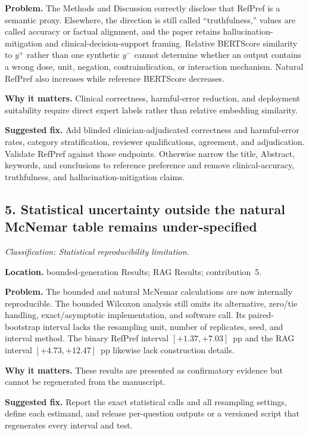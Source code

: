 \documentclass[11pt]{article}
\newcommand{\findinglabel}[1]{\textbf{#1}}
\newcommand{\classification}[1]{\textit{Classification: #1.}}
\begin{document}
\findinglabel{Problem.} The Methods and Discussion correctly disclose that RefPref is a semantic proxy.  Elsewhere, the direction is still called ``truthfulness,'' values are called accuracy or factual alignment, and the paper retains hallucination-mitigation and clinical-decision-support framing.  Relative BERTScore similarity to $y^+$ rather than one synthetic $y^-$ cannot determine whether an output contains a wrong dose, unit, negation, contraindication, or interaction mechanism.  Natural RefPref also increases while reference BERTScore decreases.

\findinglabel{Why it matters.} Clinical correctness, harmful-error reduction, and deployment suitability require direct expert labels rather than relative embedding similarity.

\findinglabel{Suggested fix.} Add blinded clinician-adjudicated correctness and harmful-error rates, category stratification, reviewer qualifications, agreement, and adjudication.  Validate RefPref against those endpoints.  Otherwise narrow the title, Abstract, keywords, and conclusions to reference preference and remove clinical-accuracy, truthfulness, and hallucination-mitigation claims.

\subsection*{5. Statistical uncertainty outside the natural McNemar table remains under-specified}

\classification{Statistical reproducibility limitation}

\findinglabel{Location.} bounded-generation Results; RAG Results; contribution~5.

\findinglabel{Problem.} The bounded and natural McNemar calculations are now internally reproducible.  The bounded Wilcoxon analysis still omits its alternative, zero/tie handling, exact/asymptotic implementation, and software call.  Its paired-bootstrap interval lacks the resampling unit, number of replicates, seed, and interval method.  The binary RefPref interval $[+1.37,+7.03]$~pp and the RAG interval $[+4.73,+12.47]$~pp likewise lack construction details.

\findinglabel{Why it matters.} These results are presented as confirmatory evidence but cannot be regenerated from the manuscript.

\findinglabel{Suggested fix.} Report the exact statistical calls and all resampling settings, define each estimand, and release per-question outputs or a versioned script that regenerates every interval and test.
\end{document}
